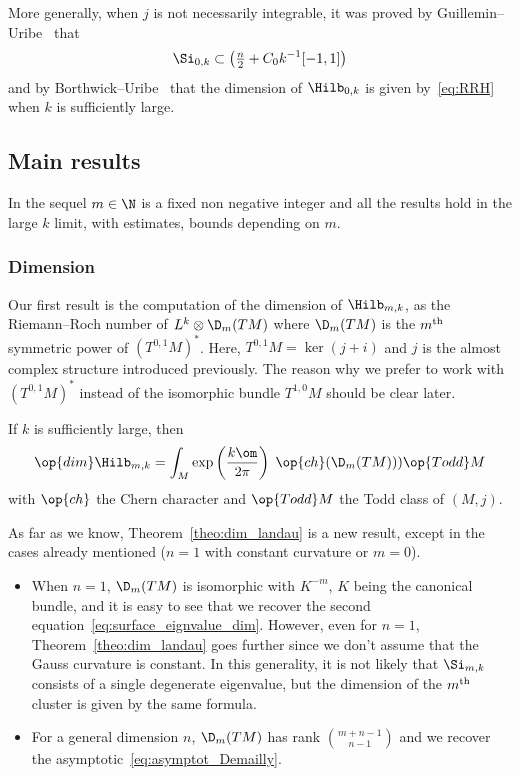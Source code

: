 More generally, when $j$ is not necessarily integrable, it was proved by Guillemin--Uribe~\cite{GuUr88} that
\begin{gather}\label{eq:si_0-k_Guillemin_Uribe}
\Si_{0,k} \subset \left(\tfrac{n}{2} + C_0 k^{-1} [-1,1] \right)
\end{gather}
and by Borthwick--Uribe~\cite{BoUr96} that the dimension of $\Hilb_{0,k}$ is given by~\eqref{eq:RRH} when $k$ is sufficiently large.

\subsection{Main results}

In the sequel $m \in \N$ is a fixed non negative integer and all the results hold in the large $k$ limit, with estimates, bounds depending on $m$.

\subsubsection{Dimension}
Our first result is the computation of the dimension of $\Hilb_{m,k}$, as the Riemann--Roch number of $L^k \otimes \D_m (TM)$ where $\D_m (TM)$ is the $m^{\rm th}$ symmetric power of $(T^{0,1} M)^*$. Here, $T^{0,1}M = \ker (j + i)$ and $j$ is the almost complex structure introduced previously. The reason why we prefer to work with $(T^{0,1}M)^*$ instead of the isomorphic bundle $T^{1,0}M$ should be clear later.

\begin{theo}\label{theo:dim_landau}
If $k$ is sufficiently large, then
\[
\op{dim} \Hilb_{m,k} = \int_M \exp \left(\frac{k\om}{2\pi} \right) \; \op{ch} (\D_m (TM))) \op{Todd} M
\]
with $\op{ch}$ the Chern character and $\op{Todd} M$ the Todd class of $(M,j)$.
\end{theo}

As far as we know, Theorem~\ref{theo:dim_landau} is a new result, except in the cases already mentioned ($n=1$ with constant curvature or $m=0$).

\begin{rema}\leavevmode
\begin{itemize}
\item[-] When $n=1$, $\D_m (TM)$ is isomorphic with $K^{-m}$, $K$ being the canonical bundle, and it is easy to see that we recover the second equation~\eqref{eq:surface_eignvalue_dim}. However, even for $n=1$, Theorem~\ref{theo:dim_landau} goes further since we don't assume that the Gauss curvature is constant. In this generality, it is not likely that $\Si_{m,k}$ consists of a single degenerate eigenvalue, but the dimension of the $m^{\rm th}$ cluster is given by the same formula.
\item[-] For a general dimension $n$, $\D_m (TM)$ has rank $\binom{ {m+n-1}}{{n-1} }$ and we recover the asymptotic~\eqref{eq:asymptot_Demailly}.
\end{itemize}
\end{rema}



